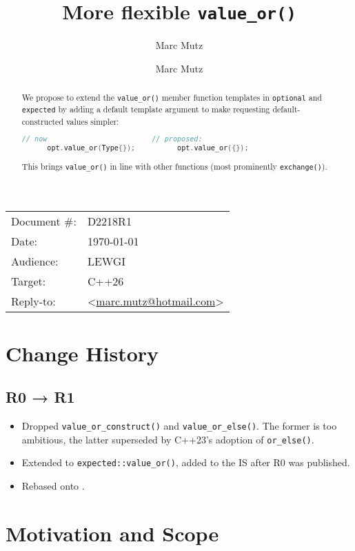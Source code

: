 \documentclass[11pt]{article}
\date{}
\title{More flexible \texttt{value\_or()}}
\author{Marc Mutz}
\makeatletter
\newcommand{\emailaddress}{marc.mutz@hotmail.com}
\newcommand{\email}{\href{mailto:\emailaddress}{\emailaddress}}
\makeatother
\begin{document}
\maketitle\vspace{-1cm}

\begin{tabular}{ll}
  Document \#:&D2218R1\\
  Date:       &\today\\
  Audience:   &LEWGI\\
  Target:     & C++26\\
  Reply-to:   &\author{Marc Mutz} \textless\email\textgreater
\end{tabular}
\begin{abstract}
  We propose to extend the \texttt{value\_or()} member function
  templates in \texttt{optional} and \texttt{expected} by adding a
  default template argument to make requesting default-constructed
  values simpler:
    \begin{lstlisting}[language=c++]
      // now                         // proposed:
      opt.value_or(Type{});          opt.value_or({});
    \end{lstlisting}
    This brings \texttt{value\_or()} in line with other functions
    (most prominently \texttt{exchange()}).
\end{abstract}

\tableofcontents

\setcounter{section}{-1}
\section{Change History}

\subsection{R0 → R1}
\begin{itemize}
\item Dropped \texttt{value\_or\_construct()} and
  \texttt{value\_or\_else()}. The former is too ambitious, the latter
  superseded by C++23's adoption of \texttt{or\_else()}.
\item Extended to \texttt{expected::value\_or()}, added to the IS
  after R0 was published.
\item Rebased onto \cite{cpp2b}.
\end{itemize}

\section{Motivation and Scope}
\end{document}
